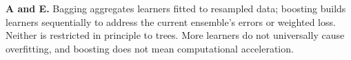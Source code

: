 \textbf{A and E.} Bagging aggregates learners fitted to resampled data; boosting builds learners sequentially to address the current ensemble's errors or weighted loss. Neither is restricted in principle to trees. More learners do not universally cause overfitting, and boosting does not mean computational acceleration.
